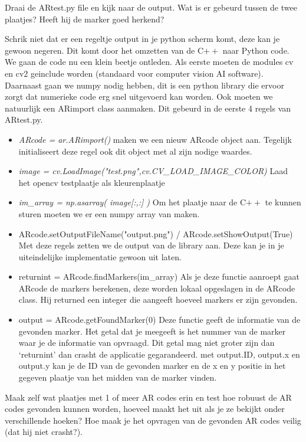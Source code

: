 \documentclass[a4paper]{article}
\begin{document}
\begin{Exercise}
 Draai de ARtest.py file en kijk naar de output. Wat is er gebeurd tussen de twee plaatjes? Heeft hij de marker goed herkend?
\end{Exercise}
\vspace{10 mm}

Schrik niet dat er een regeltje output in je python scherm komt, deze kan je gewoon negeren. Dit komt door het omzetten van de C$\stackrel{}{++}$ naar Python code. 
We gaan de code nu een klein beetje ontleden. Als eerste moeten de modules cv en cv2 geinclude worden (standaard voor computer vision AI software). Daarnaast gaan we numpy nodig hebben, dit is een python library die ervoor zorgt dat numerieke code erg snel uitgevoerd kan worden. Ook moeten we natuurlijk een ARimport class aanmaken. Dit gebeurd in de eerste 4 regels van ARtest.py.
\begin{itemize}
\item \emph{ARcode = ar.ARimport()} maken we een nieuw ARcode object aan. Tegelijk initialiseert deze regel ook dit object met al zijn nodige waardes.
\item \emph{image = cv.LoadImage("test.png",cv.CV\_LOAD\_IMAGE\_COLOR)} Laad het opencv testplaatje als kleurenplaatje
\item \emph{im\_array = np.asarray( image[:,:] ) } Om het plaatje naar de C$\stackrel{}{++}$ te kunnen sturen moeten we er een numpy array van maken.
\item{ARcode.setOutputFileName("output.png") / ARcode.setShowOutput(True)} Met deze regels zetten we de output van de library aan. Deze kan je in je uiteindelijke implementatie gewoon uit laten.
\item{returnint = ARcode.findMarkers(im\_array)} Als je deze functie aanroept gaat ARcode de markers berekenen, deze worden lokaal opgeslagen in de ARcode class. Hij returned een integer die aangeeft hoeveel markers er zijn gevonden.
\item{output = ARcode.getFoundMarker(0)} Deze functie geeft de informatie van de gevonden marker. Het getal dat je meegeeft is het nummer van de marker waar je de informatie van opvraagd. Dit getal mag niet groter zijn dan `returnint' dan crasht de applicatie gegarandeerd. met output.ID, output.x en output.y kan je de ID van de gevonden marker en de x en y positie in het gegeven plaatje van het midden van de marker vinden.
\end{itemize}

\begin{Exercise}
Maak zelf wat plaatjes met 1 of meer AR codes erin en test hoe robuust de AR codes gevonden kunnen worden, hoeveel maakt het uit als je ze bekijkt onder verschillende hoeken? Hoe maak je het opvragen van de gevonden AR codes veilig (dat hij niet crasht?). 
\end{Exercise}
\vspace{10 mm}
\end{document}
